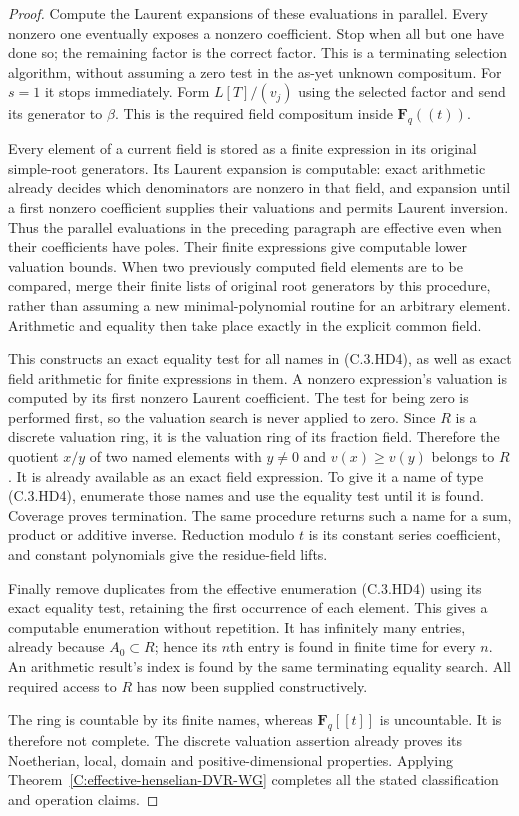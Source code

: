 \begin{proof}
Compute the Laurent expansions of these evaluations
in parallel.  Every nonzero one eventually exposes
a nonzero coefficient.  Stop when all but one have
done so; the remaining factor is the correct factor.
This is a terminating selection algorithm, without
assuming a zero test in the as-yet unknown compositum.
For $s=1$ it stops immediately.
Form $L[T]/(v_j)$ using the selected factor and send
its generator to $\beta$.  This is the required field
compositum inside $\mathbf F_q((t))$.

Every element of a current field is stored as a finite
expression in its original simple-root generators.
Its Laurent expansion is computable: exact arithmetic
already decides which denominators are nonzero in
that field, and expansion until a first nonzero
coefficient supplies their valuations and permits
Laurent inversion.  Thus the parallel evaluations
in the preceding paragraph are effective even when
their coefficients have poles.  Their finite
expressions give computable lower valuation bounds.
When two previously computed field elements are to
be compared, merge their finite lists of original
root generators by this procedure, rather than
assuming a new minimal-polynomial routine for an
arbitrary element.  Arithmetic and equality then
take place exactly in the explicit common field.

This constructs an exact equality test for all names
in (C.3.HD4), as well as exact field arithmetic for
finite expressions in them.  A nonzero expression's
valuation is computed by its first nonzero Laurent
coefficient.  The test for being zero is performed
first, so the valuation search is never applied to
zero.  Since $R$ is a discrete valuation ring, it is
the valuation ring of its fraction field.  Therefore
the quotient $x/y$ of two named elements with
$y\ne0$ and $v(x)\geq v(y)$ belongs to $R$.
It is already available as an exact field expression.
To give it a name of type (C.3.HD4), enumerate those
names and use the equality test until it is found.
Coverage proves termination.  The same procedure
returns such a name for a sum, product or additive
inverse.  Reduction modulo $t$ is its constant
series coefficient, and constant polynomials give
the residue-field lifts.

Finally remove duplicates from the effective
enumeration (C.3.HD4) using its exact equality test,
retaining the first occurrence of each element.
This gives a computable enumeration without
repetition.  It has infinitely many entries,
already because $A_0\subset R$; hence its $n$th
entry is found in finite time for every $n$.
An arithmetic result's index is found by the same
terminating equality search.  All required access
to $R$ has now been supplied constructively.

The ring is countable by its finite names, whereas
$\mathbf F_q[[t]]$ is uncountable.  It is therefore
not complete.  The discrete valuation assertion
already proves its Noetherian, local, domain and
positive-dimensional properties.  Applying
Theorem~\ref{C:effective-henselian-DVR-WG} completes
all the stated classification and operation claims.
\end{proof}

